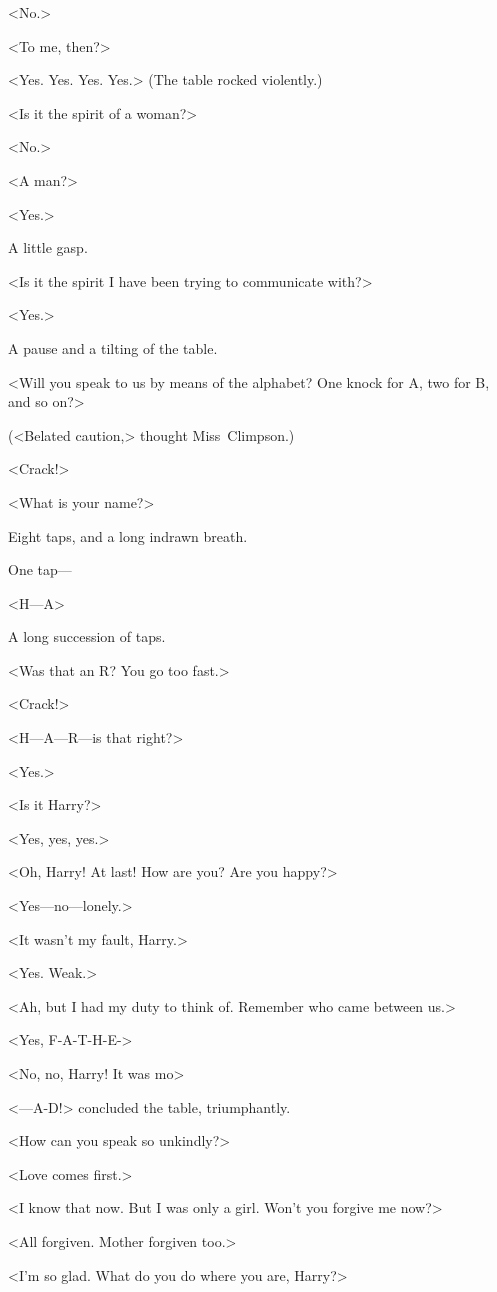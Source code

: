 <No.>

<To me, then?>

<Yes. Yes. Yes. Yes.> (The table rocked violently.)

<Is it the spirit of a woman?>

<No.>

<A man?>

<Yes.>

A little gasp.

<Is it the spirit I have been trying to communicate with?>

<Yes.>

A pause and a tilting of the table.

<Will you speak to us by means of the alphabet? One knock for A, two for B, and so on?>

(<Belated caution,> thought Miss~Climpson.)

<Crack!>

<What is your name?>

Eight taps, and a long indrawn breath.

One tap—

<H—A\longdash>

A long succession of taps.

<Was that an R? You go too fast.>

<Crack!>

<H—A—R—is that right?>

<Yes.>

<Is it Harry?>

<Yes, yes, yes.>

<Oh, Harry! At last! How are you? Are you happy?>

<Yes—no—lonely.>

<It wasn't my fault, Harry.>

<Yes. Weak.>

<Ah, but I had my duty to think of. Remember who came between us.>

<Yes, F-A-T-H-E->

<No, no, Harry! It was mo\longdash>

<—A-D!> concluded the table, triumphantly.

<How can you speak so unkindly?>

<Love comes first.>

<I know that now. But I was only a girl. Won't you forgive me now?>

<All forgiven. Mother forgiven too.>

<I'm so glad. What do you do where you are, Harry?>

